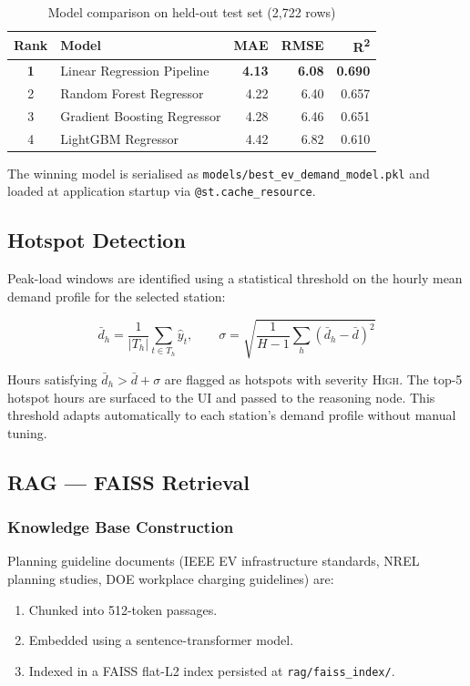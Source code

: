 \documentclass[12pt,a4paper]{article}
\begin{document}
\begin{table}[H]
\centering
\caption{Model comparison on held-out test set (2{,}722 rows)}
\begin{tabular}{clrrr}
  \toprule
  \textbf{Rank} & \textbf{Model} & \textbf{MAE} & \textbf{RMSE} & \textbf{R\textsuperscript{2}} \\
  \midrule
  \textbf{1} & Linear Regression Pipeline  & \textbf{4.13} & \textbf{6.08} & \textbf{0.690} \\
  2          & Random Forest Regressor      & 4.22 & 6.40 & 0.657 \\
  3          & Gradient Boosting Regressor  & 4.28 & 6.46 & 0.651 \\
  4          & LightGBM Regressor           & 4.42 & 6.82 & 0.610 \\
  \bottomrule
\end{tabular}
\label{tab:models}
\end{table}

The winning model is serialised as \texttt{models/best\_ev\_demand\_model.pkl}
and loaded at application startup via \texttt{@st.cache\_resource}.

\subsection{Hotspot Detection}
\label{subsec:hotspot}

Peak-load windows are identified using a statistical threshold on the hourly mean
demand profile for the selected station:

\[
  \bar{d}_h = \frac{1}{|T_h|}\sum_{t \in T_h} \hat{y}_t, \qquad
  \sigma = \sqrt{\frac{1}{H-1}\sum_h (\bar{d}_h - \bar{d})^2}
\]

Hours satisfying $\bar{d}_h > \bar{d} + \sigma$ are flagged as hotspots with
severity \textsc{High}. The top-5 hotspot hours are surfaced to the UI and
passed to the reasoning node. This threshold adapts automatically to each
station's demand profile without manual tuning.

\subsection{RAG — FAISS Retrieval}
\label{subsec:rag}

\subsubsection{Knowledge Base Construction}

Planning guideline documents (IEEE EV infrastructure standards, NREL planning
studies, DOE workplace charging guidelines) are:
\begin{enumerate}[leftmargin=*]
  \item Chunked into 512-token passages.
  \item Embedded using a sentence-transformer model.
  \item Indexed in a FAISS flat-L2 index persisted at \texttt{rag/faiss\_index/}.
\end{enumerate}
\end{document}
